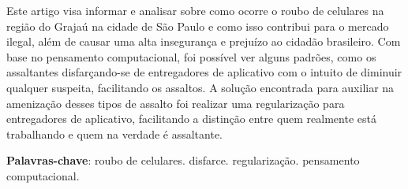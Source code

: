 \documentclass[
	article,			
	12pt,				
	oneside,			
	a4paper,						
	brazil,				
	sumario=tradicional
	]{abntex2}
\begin{document}
\frenchspacing 
\maketitle

\begin{resumoumacoluna}
    
	Este artigo visa informar e analisar sobre como ocorre o roubo de celulares na região
	do Grajaú na cidade de São Paulo e como isso contribui para o mercado ilegal, além de 
	causar uma alta insegurança e prejuízo ao cidadão brasileiro. Com base no pensamento 
	computacional, foi possível ver alguns padrões, como os assaltantes disfarçando-se de
	entregadores de aplicativo com o intuito de diminuir qualquer suspeita, facilitando
	os assaltos. A solução encontrada para auxiliar na amenização desses tipos de assalto
	foi realizar uma regularização para entregadores de aplicativo, facilitando a
	distinção entre quem realmente está trabalhando e quem na verdade é assaltante.
    
    \vspace{\onelineskip}
    
    \noindent
    \textbf{Palavras-chave}: roubo de celulares. disfarce. regularização. pensamento computacional.
\end{resumoumacoluna}

\textual

\newpage














\newpage

\end{document}

